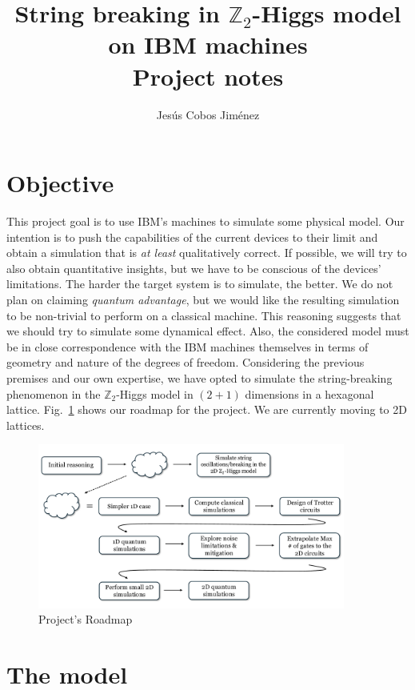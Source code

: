 \documentclass[a4paper]{article}
\title{String breaking in $\mathbb{Z}_2$-Higgs model on IBM machines \\[15pt]
       \large Project notes}
\author{Jesús Cobos Jiménez}
\begin{document}
\maketitle

\section{Objective}

This project goal is to use IBM's machines to simulate some physical model. Our intention is to push the capabilities of the current devices to their limit and obtain a simulation that is \textit{at least} qualitatively correct. If possible, we will try to also obtain quantitative insights, but we have to be conscious of the devices' limitations. The harder the target system is to simulate, the better. We do not plan on claiming \textit{quantum advantage}, but we would like the resulting simulation to be non-trivial to perform on a classical machine. This reasoning suggests that we should try to simulate some dynamical effect. Also, the considered model must be in close correspondence with the IBM machines themselves in terms of geometry and nature of the degrees of freedom. Considering the previous premises and our own expertise, we have opted to simulate the string-breaking phenomenon in the $\mathbb{Z}_2$-Higgs model in $(2+1)$ dimensions in a hexagonal lattice. Fig.~\ref{fig:roadmap} shows our roadmap for the project. We are currently moving to 2D lattices.

\begin{figure}[!ht]
    \centering
    \includegraphics[width=0.9\textwidth]{Roadmap.pdf}
    \caption{Project's Roadmap}
    \label{fig:roadmap}
\end{figure}

\section{The model}
\end{document}
